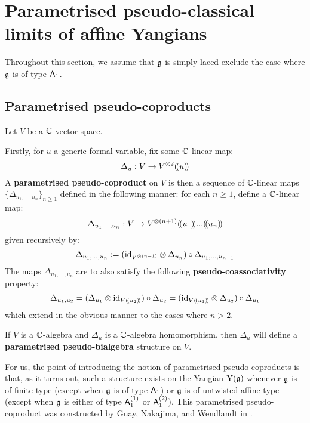 \section{Parametrised pseudo-classical limits of affine Yangians}
    \begin{convention}
        Throughout this section, we assume that $\mathfrak{g}$ is simply-laced exclude the case where $\mathfrak{g}$ is of type $\mathsf{A}_1$. 
    \end{convention}

    \subsection{Parametrised pseudo-coproducts}
        \begin{definition} \label{def: parametrised_pseudo_coproducts}
            Let $V$ be a $\mathbb{C}$-vector space. 

            Firstly, for $u$ a generic formal variable, fix some $\mathbb{C}$-linear map:
                $$\Delta_u: V \to V^{\tensor 2}(\!(u)\!)$$
            A \textbf{parametrised pseudo-coproduct} on $V$ is then a sequence of $\mathbb{C}$-linear maps $\{\Delta_{u_1, ..., u_n}\}_{n \geq 1}$ defined in the following manner: for each $n \geq 1$, define a $\mathbb{C}$-linear map:
                $$\Delta_{u_1, ..., u_n}: V \to V^{\tensor (n + 1)}(\!(u_1)\!) ... (\!(u_n)\!)$$
            given recursively by:
                $$\Delta_{u_1, ..., u_n} := ( \id_{ V^{\tensor (n - 1)} } \tensor \Delta_{u_n} ) \circ \Delta_{u_1, ..., u_{n - 1}}$$
            The maps $\Delta_{u_1, ..., u_n}$ are to also satisfy the following \textbf{pseudo-coassociativity} property:
                $$\Delta_{u_1, u_2} = ( \Delta_{u_1} \tensor \id_{V(\!(u_2)\!)} ) \circ \Delta_{u_2} = ( \id_{V(\!(u_1)\!)} \tensor \Delta_{u_2} ) \circ \Delta_{u_1}$$
            which extend in the obvious manner to the cases where $n > 2$. 

            If $V$ is a $\mathbb{C}$-algebra and $\Delta_u$ is a $\mathbb{C}$-algebra homomorphism, then $\Delta_u$ will define a \textbf{parametrised pseudo-bialgebra} structure on $V$.
        \end{definition}
        For us, the point of introducing the notion of parametrised pseudo-coproducts is that, as it turns out, such a structure exists on the Yangian $\mathrm{Y}(\mathfrak{g})$ whenever $\mathfrak{g}$ is of finite-type (except when $\mathfrak{g}$ is of type $\mathsf{A}_1$) or $\mathfrak{g}$ is of untwisted affine type (except when $\mathfrak{g}$ is either of type $\mathsf{A}_1^{(1)}$ or $\mathsf{A}_1^{(2)}$). This parametrised pseudo-coproduct was constructed by Guay, Nakajima, and Wendlandt in \cite[Section 6]{guay_nakajima_wendlandt_affine_yangian_coproduct}.
